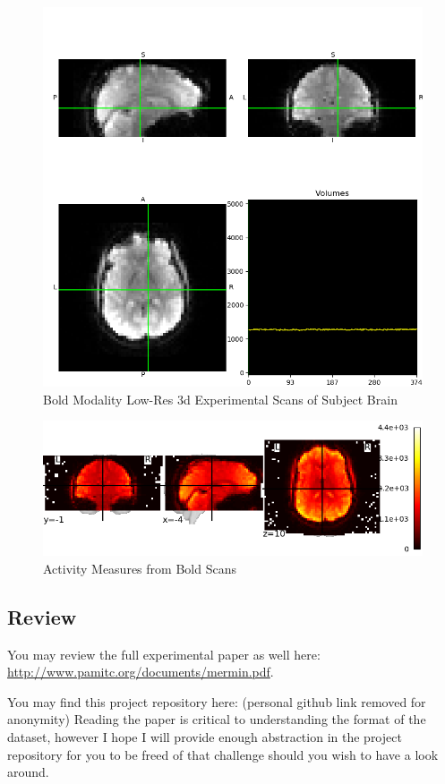 \begin{figure}
  \includegraphics[width=\linewidth]{images/orthoview_bold.png}
  \caption{Bold Modality Low-Res 3d Experimental Scans of Subject Brain}
  \label{fig:ortho-bold}
\end{figure}

\begin{figure}
  \includegraphics[width=\linewidth]{images/example_stat_map.png}
  \caption{Activity Measures from Bold Scans}
  \label{fig:ex_stat_map}
\end{figure}

\subsection{Review}\label{subsec:review}

You may review the full experimental paper as well here: \url{http://www.pamitc.org/documents/mermin.pdf}.

You may find this project repository here: (personal github link removed for anonymity)
Reading the paper is critical to understanding the format of the dataset, however I hope I will provide enough
abstraction in the project repository for you to be freed of that challenge should you wish to have a look around.
